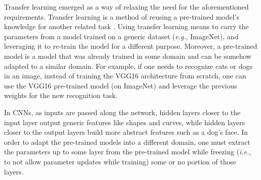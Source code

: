     Transfer learning emerged as a way of relaxing the need for the aforementioned requirements. Transfer learning is a method of reusing a pre-trained model's knowledge for another related task \cite{DipanjanSarkarRaghavBali2018}. Using transfer learning means to carry the parameters from a model trained on a generic dataset (\textit{e.g.}, ImageNet), and leveraging it to re-train the model for a different purpose. Moreover, a pre-trained model is a model that was already trained in some domain and can be somehow adapted to a similar domain. For example, if one needs to recognize cats or dogs in an image, instead of training the VGG16 architecture from scratch, one can use the VGG16 pre-trained model (on ImageNet) and leverage the previous weights for the new recognition task. \par
    
    In \ac{CNN}s, as inputs are passed along the network, hidden layers closer to the input layer output generic features like shapes and curves, while hidden layers closer to the output layers build more abstract features such as a dog's face. In order to adapt the pre-trained models into a different domain, one must extract the parameters up to some layer from the pre-trained model while freezing (\textit{i.e.}, to not allow parameter updates while training) some or no portion of those layers. \par
    
